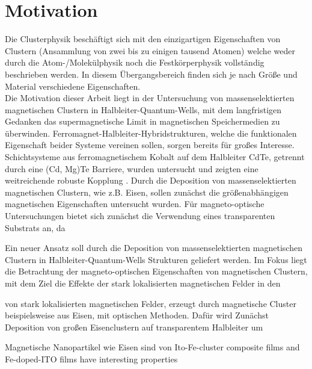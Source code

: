 \chapter{Motivation}
Die Clusterphysik beschäftigt sich mit den einzigartigen Eigenschaften von Clustern (Ansammlung von zwei bis zu einigen tausend Atomen) welche weder durch die Atom-/Molekülphysik noch die Festkörperphysik vollständig beschrieben werden.
In diesem Übergangsbereich finden sich je nach Größe und Material verschiedene Eigenschaften.\\
Die Motivation dieser Arbeit liegt in der Untersuchung von massenselektierten magnetischen Clustern in Halbleiter-Quantum-Wells, mit dem langfristigen Gedanken das supermagnetische Limit in magnetischen Speichermedien zu überwinden.
Ferromagnet-Halbleiter-Hybridstrukturen, welche die funktionalen Eigenschaft beider Systeme vereinen sollen, sorgen bereits für großes Interesse.
Schichtsysteme aus ferromagnetischem Kobalt auf dem Halbleiter CdTe, getrennt durch eine (Cd, Mg)Te Barriere, wurden untersucht und zeigten eine weitreichende robuste Kopplung \cite{Korenev.2016}.
Durch die Deposition von massenselektierten magnetischen Clustern, wie z.B. Eisen, sollen zunächst die größenabhängigen magnetischen Eigenschaften untersucht wurden.
Für magneto-optische Untersuchungen bietet sich zunächst die Verwendung eines transparenten Substrats an, da 



Ein neuer Ansatz soll durch die Deposition von massenselektierten magnetischen Clustern in Halbleiter-Quantum-Wells Strukturen geliefert werden.
Im Fokus liegt die Betrachtung der magneto-optischen Eigenschaften von magnetischen Clustern, mit dem Ziel die Effekte der stark lokalisierten magnetischen Felder in den 


von stark lokalisierten magnetischen Felder, erzeugt durch magnetische Cluster beispielsweise aus Eisen, mit optischen Methoden.
Dafür wird 
Zunächst Deposition von großen Eisenclustern auf transparentem Halbleiter um



Magnetische Nanopartikel wie Eisen sind von
Ito-Fe-cluster composite films and Fe-doped-ITO films have interesting properties \cite{Peng.2005, Ohno.2007, Shen.2015}


